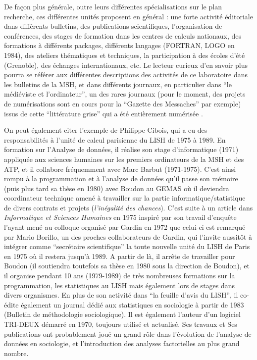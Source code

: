 De façon plus générale, outre leurs différentes spécialisations sur le plan recherche, ces différentes unités proposent en général : une forte activité éditoriale dans différents bulletins, des publications scientifiques, l'organisation de conférences, des stages de formation dans les centres de calculs nationaux, des formations à différents packages, différents langages (FORTRAN, LOGO en 1984), des ateliers thématiques et techniques, la participation à des écoles d'été (Grenoble), des échanges internationaux, etc. Le lecteur curieux d'en savoir plus pourra se référer aux différentes descriptions des activités de ce laboratoire dans les bulletins de la MSH, et dans différents journaux, en particulier dans \enquote{le médiéviste et l'ordinateur}, un des rares journaux (pour le moment, des projets de numérisations sont en cours pour la \enquote{Gazette des Messaches} par exemple) issus de cette \enquote{littérature grise} qui a été entièrement numérisée .

On peut également citer l'exemple de Philippe Cibois, qui a eu des responsabilités à l'unité de calcul parisienne du LISH de 1975 à 1989. En formation sur l’Analyse de données, il réalise son stage d’informatique (1971) appliquée aux sciences humaines sur les premiers ordinateurs de la MSH et des ATP, et il collabore fréquemment avec Marc Barbut (1971-1975). C’est ainsi rompu à la programmation et à l’analyse de données qu’il passe son mémoire (puis plus tard sa thèse en 1980) avec Boudon au GEMAS où il deviendra coordinateur technique amené à travailler sur la partie informatique/statistique de divers contrats et projets (\textit{l’inégalité des chances}). C’est suite à un article dans \textit{Informatique et Sciences Humaines} en 1975 inspiré par son travail d’enquête l’ayant mené au colloque  organisé par Gardin en 1972 que celui-ci est remarqué par Mario Borillo, un des proches collaborateurs de Gardin, qui l’invite aussitôt à intégrer comme \enquote{secrétaire scientifique} la toute nouvelle unité du LISH de Paris en 1975 où il restera jusqu’à 1989. A partir de là, il arrête de travailler pour Boudon (il soutiendra toutefois sa thèse en 1980 sous la direction de Boudon), et il organise pendant 10 ans (1979-1989) de très nombreuses formations sur la programmation, les statistiques au LISH mais également lors de stages dans divers organismes. En plus de son activité dans \enquote{la feuille d’avis du LISH}, il co-édite également un journal dédié aux statistiques en sociologie à partir de 1983 (Bulletin de méthodologie sociologique). Il est également l’auteur d’un logiciel TRI-DEUX démarré en 1970, toujours utilisé et actualisé. Ses travaux et Ses publications ont probablement joué un grand rôle dans l’évolution de l’analyse de données en sociologie, et l’introduction des analyses factorielles au plus grand nombre.

